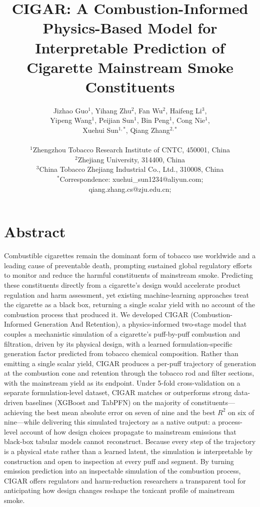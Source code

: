 \documentclass[11pt]{article}
\title{CIGAR: A Combustion-Informed Physics-Based Model for Interpretable Prediction of Cigarette Mainstream Smoke Constituents}
\author{
Jizhao Guo$^{1}$, Yihang Zhu$^{2}$, Fan Wu$^{2}$,   Haifeng Li$^{3}$, \\
Yipeng Wang$^{1}$, Peijian Sun$^{1}$, Bin Peng$^{1}$, Cong Nie$^{1}$, \\
Xuehui Sun$^{1,*}$,  Qiang Zhang$^{2,*}$\\
\\
$^{1}$Zhengzhou Tobacco Research Institute of CNTC, 450001, China \\
$^{2}$Zhejiang University, 314400, China \\
$^{3}$China Tobacco Zhejiang Industrial Co., Ltd., 310008, China \\
$^{*}$Correspondence: xuehui\_sun1234@aliyun.com; \\
qiang.zhang.cs@zju.edu.cn; \\
}
\date{}
\begin{document}
\maketitle


\section*{Abstract}

Combustible cigarettes remain the dominant form of tobacco use worldwide and a leading cause of preventable death, prompting sustained global regulatory efforts to monitor and reduce the harmful constituents of mainstream smoke. Predicting these constituents directly from a cigarette's design would accelerate product regulation and harm assessment, yet existing machine-learning approaches treat the cigarette as a black box, returning a single scalar yield with no account of the combustion process that produced it. We developed CIGAR (Combustion-Informed Generation And Retention), a physics-informed two-stage model that couples a mechanistic simulation of a cigarette's puff-by-puff combustion and filtration, driven by its physical design, with a learned formulation-specific generation factor predicted from tobacco chemical composition. Rather than emitting a single scalar yield, CIGAR produces a per-puff trajectory of generation at the combustion cone and retention through the tobacco rod and filter sections, with the mainstream yield as its endpoint. Under 5-fold cross-validation on a separate formulation-level dataset, CIGAR matches or outperforms strong data-driven baselines (XGBoost and TabPFN) on the majority of constituents---achieving the best mean absolute error on seven of nine and the best $R^2$ on six of nine---while delivering this simulated trajectory as a native output: a process-level account of how design choices propagate to mainstream emissions that black-box tabular models cannot reconstruct. Because every step of the trajectory is a physical state rather than a learned latent, the simulation is interpretable by construction and open to inspection at every puff and segment. By turning emission prediction into an inspectable simulation of the combustion process, CIGAR offers regulators and harm-reduction researchers a transparent tool for anticipating how design changes reshape the toxicant profile of mainstream smoke.
\end{document}
